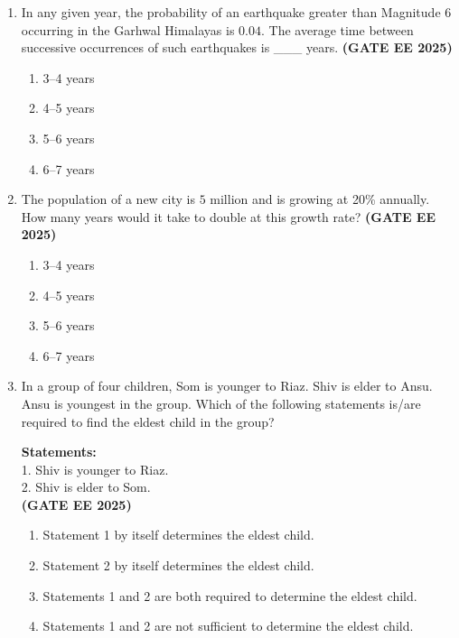 \documentclass[journal,12pt,onecolumn]{IEEEtran}
\theoremstyle{remark}
\begin{document}
\begin{enumerate}
    \item In any given year, the probability of an earthquake greater than Magnitude 6 occurring in the Garhwal Himalayas is $0.04$. The average time between successive occurrences of such earthquakes is \_\_\_ years.  \hfill \textbf{(GATE EE 2025)}

    \begin{enumerate} 
        \item 3--4 years
        \item 4--5 years
        \item 5--6 years
        \item 6--7 years
    \end{enumerate}

    \item The population of a new city is $5$ million and is growing at 20\% annually. How many years would it take to double at this growth rate?  \hfill \textbf{(GATE EE 2025)}

    \begin{enumerate} 
        \item 3--4 years
        \item 4--5 years
        \item 5--6 years
        \item 6--7 years
    \end{enumerate}

    \item In a group of four children, Som is younger to Riaz. Shiv is elder to Ansu. Ansu is youngest in the group. Which of the following statements is/are required to find the eldest child in the group?  

    \textbf{Statements:}  \\
    1. Shiv is younger to Riaz.  \\
    2. Shiv is elder to Som.  \\ \hfill \textbf{(GATE EE 2025)}

    \begin{enumerate} 
        \item Statement 1 by itself determines the eldest child.  
        \item Statement 2 by itself determines the eldest child.  
        \item Statements 1 and 2 are both required to determine the eldest child.  
        \item Statements 1 and 2 are not sufficient to determine the eldest child.  
    \end{enumerate}


\end{enumerate}
\end{document}

